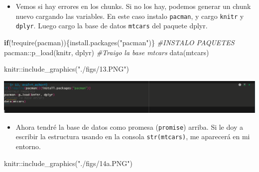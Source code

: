\documentclass[
]{article}
\newenvironment{Shaded}{}{}
\newcommand{\CommentTok}[1]{\textcolor[rgb]{0.38,0.63,0.69}{\textit{#1}}}
\newcommand{\ControlFlowTok}[1]{\textcolor[rgb]{0.00,0.44,0.13}{\textbf{#1}}}
\newcommand{\FunctionTok}[1]{\textcolor[rgb]{0.02,0.16,0.49}{#1}}
\newcommand{\NormalTok}[1]{#1}
\newcommand{\SpecialCharTok}[1]{\textcolor[rgb]{0.25,0.44,0.63}{#1}}
\newcommand{\StringTok}[1]{\textcolor[rgb]{0.25,0.44,0.63}{#1}}
\providecommand{\tightlist}{%
  \setlength{\itemsep}{0pt}\setlength{\parskip}{0pt}}
\begin{document}
\begin{itemize}
\tightlist
\item
  Vemos si hay errores en los chunks. Si no los hay, podemos generar un
  chunk nuevo cargando las variables. En este caso instalo
  \texttt{pacman}, y cargo \texttt{knitr} y \texttt{dplyr}. Luego cargo
  la base de datos \texttt{mtcars} del paquete dplyr.
\end{itemize}

\begin{Shaded}
\begin{Highlighting}[]
\ControlFlowTok{if}\NormalTok{(}\SpecialCharTok{!}\FunctionTok{require}\NormalTok{(pacman))\{}\FunctionTok{install.packages}\NormalTok{(}\StringTok{"pacman"}\NormalTok{)\}}
\CommentTok{\#INSTALO PAQUETES}
\NormalTok{pacman}\SpecialCharTok{::}\FunctionTok{p\_load}\NormalTok{(knitr, dplyr)}
\CommentTok{\#Traigo la base mtcars}
\FunctionTok{data}\NormalTok{(mtcars)}
\end{Highlighting}
\end{Shaded}

\begin{Shaded}
\begin{Highlighting}[]
\NormalTok{knitr}\SpecialCharTok{::}\FunctionTok{include\_graphics}\NormalTok{(}\StringTok{"./figs/13.PNG"}\NormalTok{)}
\end{Highlighting}
\end{Shaded}

\begin{center}\includegraphics[width=0.6\linewidth]{./figs/13} \end{center}

\begin{itemize}
\tightlist
\item
  Ahora tendré la base de datos como promesa (\texttt{promise}) arriba.
  Si le doy a escribir la estructura usando en la consola
  \texttt{str(mtcars)}, me aparecerá en mi entorno.
\end{itemize}

\begin{Shaded}
\begin{Highlighting}[]
\NormalTok{knitr}\SpecialCharTok{::}\FunctionTok{include\_graphics}\NormalTok{(}\StringTok{"./figs/14a.PNG"}\NormalTok{)}
\end{Highlighting}
\end{Shaded}
\end{document}
